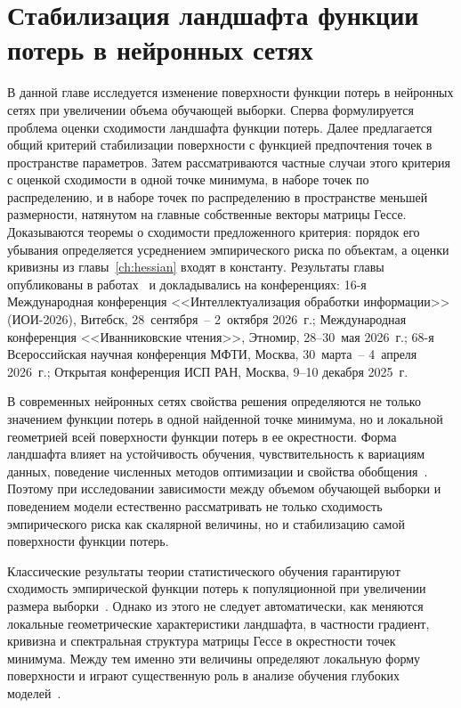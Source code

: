 \chapter{Стабилизация ландшафта функции потерь в нейронных сетях}\label{ch:landscapes}

В данной главе исследуется изменение поверхности функции потерь в нейронных сетях при увеличении объема обучающей выборки. Сперва формулируется проблема оценки сходимости ландшафта функции потерь. Далее предлагается общий критерий стабилизации поверхности с функцией предпочтения точек в пространстве параметров. Затем рассматриваются частные случаи этого критерия с оценкой сходимости в одной точке минимума, в наборе точек по распределению, и в наборе точек по распределению в пространстве меньшей размерности, натянутом на главные собственные векторы матрицы Гессе. Доказываются теоремы о сходимости предложенного критерия: порядок его убывания определяется усреднением эмпирического риска по объектам, а оценки кривизны из главы~\ref{ch:hessian} входят в константу. Результаты главы опубликованы в работах~\cite{kiselev2024unraveling,meshkov2024convnets,kiselev2026ispras,kiselev2026conf68mipt} и докладывались на конференциях: 16-я Международная конференция <<Интеллектуализация обработки информации>> (ИОИ-2026), Витебск, 28~сентября~-- 2~октября 2026~г.; Международная конференция <<Иванниковские чтения>>, Этномир, 28--30~мая 2026~г.; 68-я Всероссийская научная конференция МФТИ, Москва, 30~марта~-- 4~апреля 2026~г.; Открытая конференция ИСП РАН, Москва, 9--10 декабря 2025~г.


В современных нейронных сетях свойства решения определяются не только значением функции потерь в одной найденной точке минимума, но и локальной геометрией всей поверхности функции потерь в ее окрестности. Форма ландшафта влияет на устойчивость обучения, чувствительность к вариациям данных, поведение численных методов оптимизации и свойства обобщения~\cite{goodfellow2015qualitatively,li2018visualizing,draxler2018essentially,garipov2018loss,keskar2017largebatch,foret2021sam}. Поэтому при исследовании зависимости между объемом обучающей выборки и поведением модели естественно рассматривать не только сходимость эмпирического риска как скалярной величины, но и стабилизацию самой поверхности функции потерь.

Классические результаты теории статистического обучения гарантируют сходимость эмпирической функции потерь к популяционной при увеличении размера выборки~\cite{vapnik1998statistical,shalev2014understanding}. Однако из этого не следует автоматически, как меняются локальные геометрические характеристики ландшафта, в частности градиент, кривизна и спектральная структура матрицы Гессе в окрестности точек минимума. Между тем именно эти величины определяют локальную форму поверхности и играют существенную роль в анализе обучения глубоких моделей~\cite{dauphin2014,sagun2017hessian,ghorbani2019investigation,papyan2020traces}.

